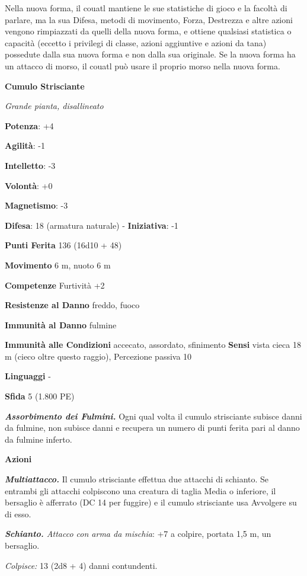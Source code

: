 \begin{multicols}{2}
Nella nuova forma, il couatl mantiene le sue statistiche di gioco e la
facoltà di parlare, ma la sua Difesa, metodi di movimento, Forza, Destrezza
e altre azioni vengono rimpiazzati da quelli della nuova forma, e
ottiene qualsiasi statistica o capacità (eccetto i privilegi di classe,
azioni aggiuntive e azioni da tana) possedute dalla sua nuova forma e
non dalla sua originale. Se la nuova forma ha un attacco di morso, il
couatl può usare il proprio morso nella nuova forma.

\textbf{Cumulo Strisciante}

\emph{Grande pianta, disallineato}

\textbf{Potenza}: +4

\textbf{Agilità}: -1

\textbf{Intelletto}: -3

\textbf{Volontà}: +0

\textbf{Magnetismo}: -3

\textbf{Difesa}: 18 (armatura naturale) - \textbf{Iniziativa}: -1

\textbf{Punti Ferita} 136 (16d10 + 48)

\textbf{Movimento} 6 m, nuoto 6 m

\textbf{Competenze} Furtività +2

\textbf{Resistenze al Danno} freddo, fuoco

\textbf{Immunità al Danno} fulmine

\textbf{Immunità alle Condizioni} accecato, assordato, sfinimento
\textbf{Sensi} vista cieca 18 m (cieco oltre questo raggio), Percezione
passiva 10

\textbf{Linguaggi} -

\textbf{Sfida} 5 (1.800 PE)

\emph{\textbf{Assorbimento dei Fulmini.}} Ogni qual volta il cumulo
strisciante subisce danni da fulmine, non subisce danni e recupera un
numero di punti ferita pari al danno da fulmine inferto.

\textbf{Azioni}

\emph{\textbf{Multiattacco.}} Il cumulo strisciante effettua due
attacchi di schianto. Se entrambi gli attacchi colpiscono una creatura
di taglia Media o inferiore, il bersaglio è afferrato (DC 14 per
fuggire) e il cumulo strisciante usa Avvolgere su di esso.

\emph{\textbf{Schianto.} Attacco con arma da mischia}: +7 a colpire,
portata 1,5 m, un bersaglio.

\emph{Colpisce:} 13 (2d8 + 4) danni contundenti.


\end{multicols}
